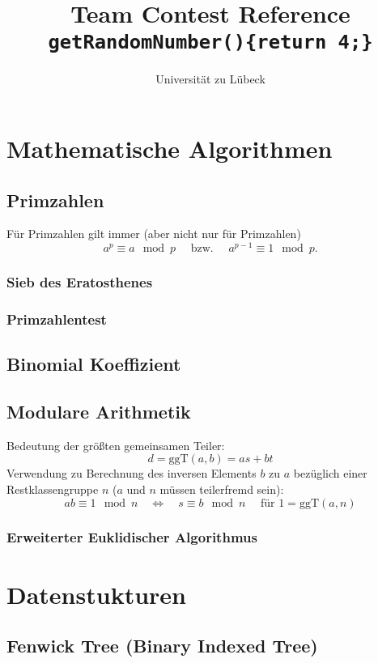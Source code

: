 \documentclass[10pt,a4paper,ngerman]{article}
\title{Team Contest Reference\\ \texttt{getRandomNumber()\{return 4;\}}}
\author{Universität zu Lübeck}
\begin{document}
\lstset{basicstyle=\ttfamily\footnotesize,numbers=left,numberstyle=\tiny,tabsize=2,numbersep=5pt}
\maketitle\thispagestyle{fancy}

\tableofcontents

\section{Mathematische Algorithmen}
\subsection{Primzahlen}
Für Primzahlen gilt immer (aber nicht nur für Primzahlen)
\[a^p\equiv a\mod p \quad\text{ bzw. }\quad a^{p-1}\equiv 1 \mod p.\]
\subsubsection{Sieb des Eratosthenes}

\subsubsection{Primzahlentest}

\subsection{Binomial Koeffizient}

\subsection{Modulare Arithmetik}
Bedeutung der größten gemeinsamen Teiler:
\[ d = \text{ggT}(a,b) = as+bt \]
Verwendung zu Berechnung des inversen Elements $b$ zu $a$ bezüglich einer Restklassengruppe $n$ ($a$ und $n$ müssen teilerfremd sein):
\[ ab\equiv 1 \mod n\quad\Leftrightarrow\quad s\equiv b \mod n\quad\text{ für }1=\text{ggT}(a,n)\]
\subsubsection{Erweiterter Euklidischer Algorithmus}

\section{Datenstukturen}
\subsection{Fenwick Tree (Binary Indexed Tree)}

\end{document}

